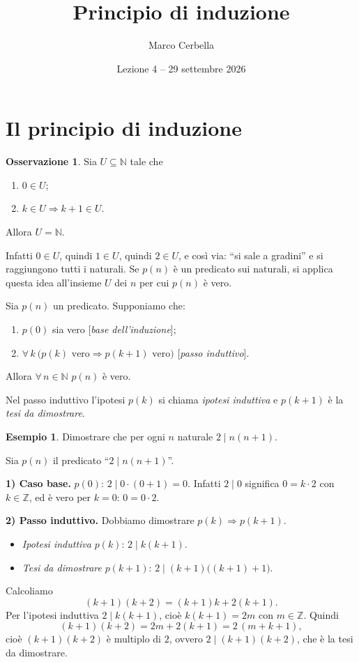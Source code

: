 \documentclass[11pt,a4paper]{article}
\title{Principio di induzione}
\author{Marco Cerbella}
\date{Lezione 4 -- 29 settembre 2026}
\theoremstyle{definition}
\newtheorem*{esempio}{Esempio}
\newtheorem*{osservazione}{Osservazione}
\begin{document}
\maketitle

\section{Il principio di induzione}

\begin{osservazione}
Sia $U \subseteq \mathbb{N}$ tale che
\begin{enumerate}
    \item $0 \in U$;
    \item $k \in U \Rightarrow k + 1 \in U$.
\end{enumerate}
Allora $U = \mathbb{N}$.
\end{osservazione}

Infatti $0 \in U$, quindi $1 \in U$, quindi $2 \in U$, e così via: ``si sale
a gradini'' e si raggiungono tutti i naturali. Se $p(n)$ è un predicato
sui naturali, si applica questa idea all'insieme $U$ dei $n$ per cui
$p(n)$ è vero.

\begin{teorema}
Sia $p(n)$ un predicato. Supponiamo che:
\begin{enumerate}
    \item $p(0)$ sia vero \hfill [\emph{base dell'induzione}];
    \item $\forall\, k \ \big(p(k) \text{ vero} \Rightarrow p(k+1)
          \text{ vero}\big)$ \hfill [\emph{passo induttivo}].
\end{enumerate}
Allora $\forall\, n \in \mathbb{N}$ $p(n)$ è vero.
\end{teorema}

Nel passo induttivo l'ipotesi $p(k)$ si chiama \emph{ipotesi induttiva} e
$p(k+1)$ è la \emph{tesi da dimostrare}.

\begin{esempio}
Dimostrare che per ogni $n$ naturale $2 \mid n(n+1)$.

Sia $p(n)$ il predicato ``$2 \mid n(n+1)$''.

\textbf{1) Caso base.} $p(0)$: $2 \mid 0 \cdot (0 + 1) = 0$. Infatti
$2 \mid 0$ significa $0 = k \cdot 2$ con $k \in \mathbb{Z}$, ed è vero per
$k = 0$: $0 = 0 \cdot 2$.

\textbf{2) Passo induttivo.} Dobbiamo dimostrare $p(k) \Rightarrow
p(k+1)$.
\begin{itemize}
    \item \emph{Ipotesi induttiva} $p(k)$: $2 \mid k(k+1)$.
    \item \emph{Tesi da dimostrare} $p(k+1)$: $2 \mid (k+1)\big((k+1)+1\big)$.
\end{itemize}
Calcoliamo
\[
(k+1)(k+2) = (k+1)k + 2(k+1).
\]
Per l'ipotesi induttiva $2 \mid k(k+1)$, cioè $k(k+1) = 2m$ con
$m \in \mathbb{Z}$. Quindi
\[
(k+1)(k+2) = 2m + 2(k+1) = 2\,(m + k + 1),
\]
cioè $(k+1)(k+2)$ è multiplo di $2$, ovvero $2 \mid (k+1)(k+2)$, che è la
tesi da dimostrare.
\end{esempio}
\end{document}
